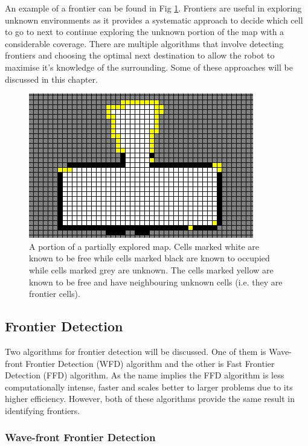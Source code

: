 \documentclass[a4paper,12pt]{article}
\begin{document}
			An example of a frontier can be found in Fig \ref{frontierExample}. Frontiers are useful in exploring unknown environments as it provides a systematic approach to decide which cell to go to next to continue exploring the unknown portion of the map with a considerable coverage. There are multiple algorithms that involve detecting frontiers and choosing the optimal next destination to allow the robot to maximise it's knowledge of the surrounding. Some of these approaches will be discussed in this chapter.

			\begin{figure}[H]
				\centering
				\includegraphics[scale=0.6]{images/frontierExample.png}
				\caption{A portion of a partially explored map. Cells marked white are known to be free while cells marked black are known to occupied while cells marked grey are unknown. The cells marked yellow are known to be free and have neighbouring unknown cells (i.e. they are frontier cells).}
				\label{frontierExample}
			\end{figure}

			\subsection{Frontier Detection}

				Two algorithms for frontier detection will be discussed. One of them is Wave-front Frontier Detection (WFD) algorithm and the other is Fast Frontier Detection (FFD) algorithm. As the name implies the FFD algorithm is less computationally intense, faster and scales better to larger problems due to its higher efficiency. However, both of these algorithms provide the same result in identifying frontiers.
				
				\subsubsection{Wave-front Frontier Detection}
\end{document}
